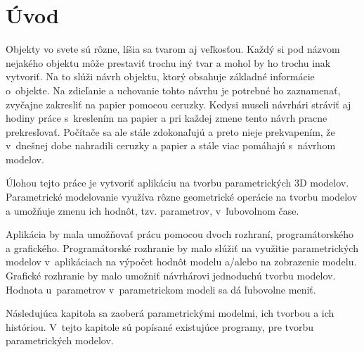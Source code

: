 

\chapter{Úvod}

Objekty vo svete sú rôzne, líšia sa tvarom aj veľkosťou. 
Každý si pod názvom nejakého objektu môže prestaviť trochu iný tvar a mohol by ho trochu inak vytvoriť. Na to slúži návrh objektu, ktorý obsahuje základné informácie o~objekte. Na zdieľanie a uchovanie tohto návrhu je potrebné ho zaznamenať, zvyčajne zakresliť  na papier pomocou ceruzky. Kedysi museli návrhári stráviť aj hodiny práce s~kreslením na papier a pri každej zmene tento návrh pracne prekresľovať. 
Počítače sa ale stále zdokonaľujú a preto nieje prekvapením, že v~dnešnej dobe nahradili ceruzky a papier a stále viac pomáhajú s~návrhom modelov.






Úlohou tejto práce je vytvoriť aplikáciu na tvorbu parametrických 3D modelov. Parametrické modelovanie využíva rôzne geometrické operácie na tvorbu modelov a umožňuje zmenu ich hodnôt, tzv. parametrov, v~ľubovolnom čase. 

Aplikácia by mala umožňovať prácu pomocou dvoch rozhraní, programátorského a grafického. Programátorské rozhranie by malo slúžiť na využitie parametrických modelov v~aplikáciach na výpočet hodnôt modelu a/alebo na zobrazenie modelu. Grafické rozhranie by malo umožniť návrhárovi jednoduchú tvorbu modelov. Hodnota u~parametrov v~parametrickom modeli sa dá ľubovolne meniť.



Následujúca kapitola sa zaoberá parametrickými modelmi, ich tvorbou a ich históriou.
V~tejto kapitole sú popísané existujúce programy, pre tvorbu parametrických modelov.


